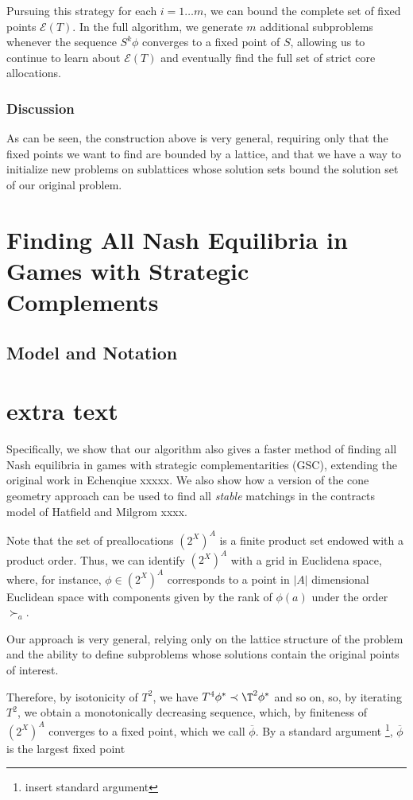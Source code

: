 \documentclass[11pt,reqno]{amsart}
\theoremstyle{definition}
\numberwithin{equation}{section}
\newcommand{\ol}{\overline}
\newcommand{\pre}{\phi}
\newcommand{\prealloc}{(2^X)^A}
\newcommand{\fix}{\mathcal{E}}
\newcommand{\su}{\succ}
\newcommand{\pe}{\prec}
\newcommand{\toppre}{\ol{\pre}}
\begin{document}
Pursuing this strategy for each $i = 1 \hdots m$, we can bound the complete set of fixed points $\fix(T)$. 
In the full algorithm, we generate $m$ additional subproblems whenever the sequence $S^k \pre$ converges to a fixed point of $S$, allowing us to continue to learn about $\fix(T)$ and eventually find the full set of strict core allocations. 












\subsubsection{Discussion}
As can be seen, the construction above is very general, requiring only that the fixed points we want to find are bounded by a lattice, and that we have a way to initialize new problems on sublattices whose solution sets bound the solution set of our original problem. 

\section{Finding All Nash Equilibria in Games with Strategic Complements}
\subsection{Model and Notation}





\section{extra text} 

Specifically, we show that our algorithm also gives a faster method of finding all Nash equilibria in games with strategic complementarities (GSC), extending the original work in Echenqiue xxxxx.  
We also show how a version of the cone geometry approach can be used to find all \emph{stable} matchings in the contracts model of Hatfield and Milgrom xxxx.  

Note that the set of preallocations $\prealloc$ is a finite product set endowed with a product order.
Thus, we can identify $\prealloc$ with a grid in Euclidena space, where, for instance, $\pre \in \prealloc$ corresponds to a point in $|A|$ dimensional Euclidean space with components given by the rank of $\pre(a)$ under the order $\su_a$. 

Our approach is very general, relying only on the lattice structure of the problem and the ability to define subproblems whose solutions contain the original points of interest.  

Therefore, by isotonicity of $T^2$, we have $T^4 \pre^* \pe \T^2 \pre^*$ and so on, so, by iterating $T^2$, we obtain a monotonically decreasing sequence, which, by finiteness of $\prealloc$ converges to a fixed point, which we call $\toppre$.
By a standard argument \footnote{insert standard argument}, $\toppre$ is the largest fixed point 
\end{document}
